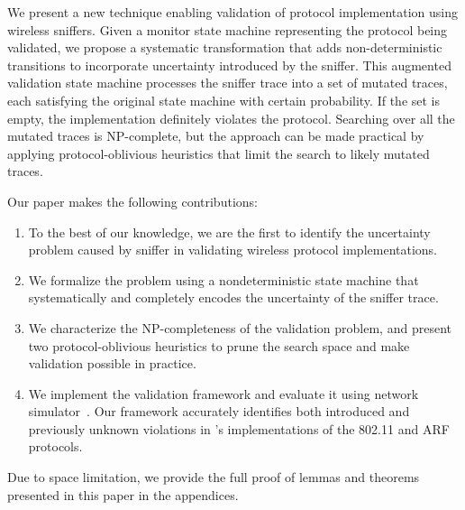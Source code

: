 We present a new technique enabling validation of protocol implementation using
wireless sniffers. Given a monitor state machine representing the protocol being
validated, we propose a systematic transformation that adds non-deterministic
transitions to incorporate uncertainty introduced by the sniffer.  This
augmented validation state machine processes the sniffer trace into a set of
mutated traces, each satisfying the original state machine with certain
probability. If the set is empty, the implementation definitely violates the
protocol. Searching over all the mutated traces is NP-complete, but the approach
can be made practical by applying protocol-oblivious heuristics that limit the
search to likely mutated traces.

Our paper makes the following contributions:
\begin{enumerate}
		  \item To the best of our knowledge, we are the first to identify the
    uncertainty problem caused by sniffer in validating wireless protocol
    implementations.
		  \item We formalize the problem using a nondeterministic state machine that
    systematically and completely encodes the uncertainty of the
    sniffer trace.
		    \item We characterize the NP-completeness of the validation problem, and
      present two protocol-oblivious heuristics to prune the search
      space and make validation possible in practice.
			\item We implement the validation framework and evaluate it using
    \ns{} network simulator~\cite{riley2010ns}.
		    Our framework accurately identifies both introduced and previously
    unknown violations in \ns{}'s implementations of the 802.11 and ARF protocols.
\end{enumerate}

Due to space limitation, we provide the full proof of lemmas and theorems
presented in this paper in the appendices.

\begin{comment}
The rest of this paper is organized as follows.
We motivate the uncertainty problem in Section~\ref{sec:model}.
We then formally describe the problem in Section~\ref{sec:framework},
including the completeness of the augmentation (\S~\ref{subsec:augment}),
hardness analysis (\S~\ref{subsec:hard}) and search algorithms
(\S~\ref{subsec:search}).
We continue by evaluating our framework through two case studies in
Section~\ref{sec:case}.  Finally, we present related works in
Section~\ref{sec:related} and concludes in Section~\ref{sec:conclusion}.
\end{comment}
